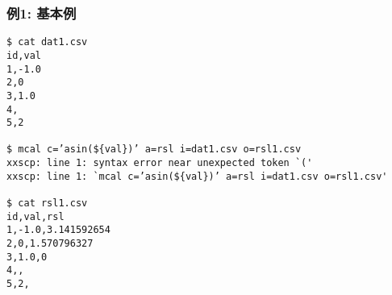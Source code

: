 
\subsubsection*{例1: 基本例}


\begin{Verbatim}[baselinestretch=0.7,frame=single]
$ cat dat1.csv
id,val
1,-1.0
2,0
3,1.0
4,
5,2

$ mcal c=’asin(${val})’ a=rsl i=dat1.csv o=rsl1.csv
xxscp: line 1: syntax error near unexpected token `('
xxscp: line 1: `mcal c=’asin(${val})’ a=rsl i=dat1.csv o=rsl1.csv'

$ cat rsl1.csv
id,val,rsl
1,-1.0,3.141592654
2,0,1.570796327
3,1.0,0
4,,
5,2,
\end{Verbatim}
